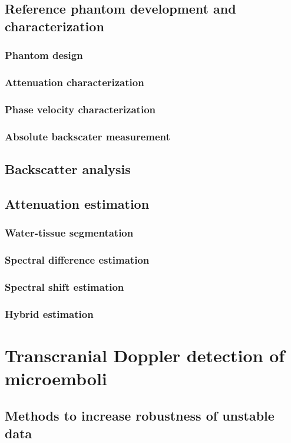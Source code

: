 \documentclass[12pt,twoside]{withesis}
\begin{document}
\section{Reference phantom development and characterization}
\subsection{Phantom design}
\subsection{Attenuation characterization}
\subsection{Phase velocity characterization}
\subsection{Absolute backscater measurement}

\section{Backscatter analysis}

\section{Attenuation estimation}
\subsection{Water-tissue segmentation}
\subsection{Spectral difference estimation}
\subsection{Spectral shift estimation}
\subsection{Hybrid estimation}


\chapter{Transcranial Doppler detection of microemboli}

\section{Methods to increase robustness of unstable data}
\end{document}
